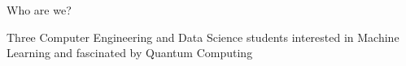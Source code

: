 \begin{frame}{Who are we?}

Three Computer Engineering and Data Science students interested in Machine Learning and fascinated by Quantum Computing
    
\end{frame}

